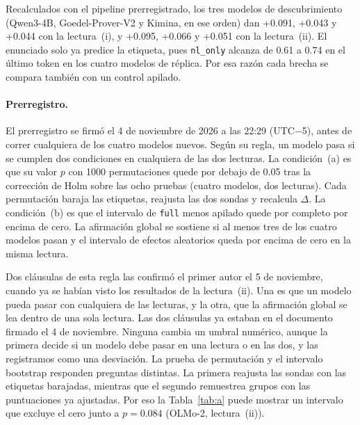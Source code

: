 \documentclass[10pt]{article}
\newcommand{\vr}[1]{\texttt{#1}}
\newcommand{\D}{\Delta}
\begin{document}
Recalculados con el pipeline prerregistrado, los tres modelos de descubrimiento (Qwen3-4B, Goedel-Prover-V2 y Kimina, en ese orden) dan +0.091, +0.043 y +0.044 con la
lectura~(i), y +0.095, +0.066 y +0.051 con la lectura~(ii). El enunciado solo ya predice la etiqueta, pues
\vr{nl\_only} alcanza de 0.61 a 0.74 en el último token en los cuatro modelos de réplica. Por esa razón cada brecha se compara también
con un control apilado.

\paragraph{Prerregistro.}
El prerregistro se firmó el 4 de noviembre de 2026 a las 22:29 (UTC$-$5), antes de correr cualquiera de los cuatro
modelos nuevos. Según su regla, un modelo pasa si se cumplen dos condiciones en cualquiera de las dos lecturas. La
condición~(a) es que su valor $p$ con 1000 permutaciones quede por debajo de 0.05 tras la corrección de Holm
\citep{holm} sobre las ocho pruebas (cuatro modelos, dos lecturas). Cada permutación baraja las etiquetas, reajusta
las dos sondas y recalcula $\D$. La condición~(b) es que el intervalo de \vr{full} menos apilado quede por completo
por encima de cero. La afirmación global se sostiene si al menos tres de los cuatro modelos pasan y el intervalo de
efectos aleatorios queda por encima de cero en la misma lectura.

Dos cláusulas de esta regla las confirmó el primer autor el 5 de noviembre, cuando ya se habían visto los
resultados de la lectura~(ii). Una es que un modelo pueda pasar con cualquiera de las lecturas, y la otra, que la
afirmación global se lea dentro de una sola lectura.
Las dos cláusulas ya estaban en el documento firmado el 4 de noviembre. Ninguna cambia un umbral numérico, aunque la primera decide si
un modelo debe pasar en una lectura o en las dos, y las registramos como una desviación.
La prueba de permutación y el intervalo bootstrap responden preguntas distintas. La primera reajusta las sondas con
las etiquetas barajadas, mientras que el segundo remuestrea grupos con las puntuaciones ya ajustadas. Por eso la
Tabla~\ref{tab:a} puede mostrar un intervalo que excluye el cero junto a $p = 0.084$ (OLMo-2, lectura~(ii)).
\end{document}
